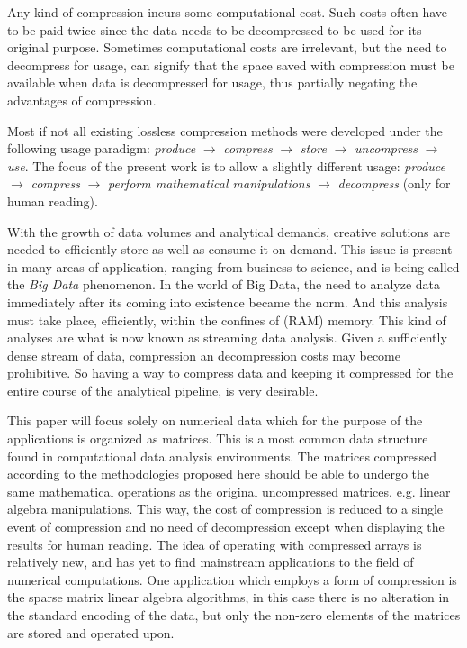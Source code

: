 \documentclass[10pt]{article}
\begin{document}
Any kind of compression incurs some computational cost. Such costs often have to be paid twice since the data needs to be decompressed to be used for its original purpose. Sometimes computational costs are irrelevant, but the need to decompress for usage, can signify that the space saved with compression must be available when data is decompressed for usage, thus partially negating the advantages of compression.

Most if not all existing lossless compression methods were developed under the following usage paradigm: \textit{produce} $\rightarrow$ \textit{compress} $\rightarrow$ \textit{store} $\rightarrow$ \textit{uncompress} $\rightarrow$ \textit{use}. The focus of the present work is to allow a slightly different usage:  \textit{produce} $\rightarrow$ \textit{compress} $\rightarrow$ \textit{perform mathematical manipulations} $\rightarrow$ \textit{decompress} (only for human reading).

With the growth of data volumes and analytical demands, creative solutions are needed to efficiently store as well as consume it on demand. This issue is present in many areas of application, ranging from business to science\cite{lynch}, and is being called the \textit{Big Data} phenomenon. In the world of Big Data, the need to analyze data immediately after its coming into existence became the norm. And this analysis must take place, efficiently, within the confines of (RAM) memory. This kind of analyses are what is now known as streaming data analysis\cite{gaber2005mining}. Given a sufficiently dense stream of data, compression an decompression costs may become prohibitive. So having a way to compress data and keeping it compressed for the entire course of the analytical pipeline, is very desirable.

This paper will focus solely on numerical data which for the purpose of the applications is organized as   matrices. This is a most common data structure found in computational data analysis environments. The matrices compressed according to the methodologies proposed here should be able to undergo the same mathematical operations as the original uncompressed matrices. e.g. linear algebra manipulations. This way, the cost of compression is reduced to a single event of compression and no need of decompression except when displaying the results for human reading. The idea of operating with compressed arrays is relatively new\cite{yemliha2007compiler}, and has yet to find mainstream applications to the field of numerical computations. One application which employs a form of compression is the sparse matrix linear algebra algorithms\cite{dodson1991sparse}, in this case there is no alteration in the standard encoding of the data, but only the non-zero elements of the matrices are stored and operated upon. 
\end{document}
